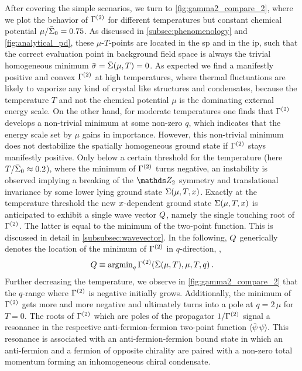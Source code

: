 After covering the simple scenarios, we turn to \cref{fig:gamma2_compare_2}, where we plot the behavior of $\Gamma^{(2)}$ for different temperatures but constant chemical potential ${\mu/\bar{\Sigma}_0 = 0.75}$.
As discussed in \cref{subsec:phenomenology} and \cref{fig:analytical_pd}, these $\mu$-$T$-points are located in the \gls{sp} and in the \gls{ip}, such that the correct evaluation point in background field space is always the trivial homogeneous minimum ${\bar{\sigma} = \bar{\Sigma} ( \mu, T ) = 0}$.
As expected we find a manifestly positive and convex $\Gamma^{(2)}$ at high temperatures, where thermal fluctuations are likely to vaporize any kind of crystal like structures and condensates, because the temperature $T$ and not the chemical potential $\mu$ is the dominating external energy scale.
On the other hand, for moderate temperatures one finds that $\Gamma^{(2)}$ develops a non-trivial minimum at some non-zero $q$, which indicates that the energy scale set by $\mu$ gains in importance.
However, this non-trivial minimum does not destabilize the spatially homogeneous ground state if $\Gamma^{(2)}$ stays manifestly positive.
Only below a certain threshold for the temperature (here $T/\bar{\Sigma}_0 \approx 0.2$), where the minimum of $\Gamma^{(2)}$ turns negative, an instability is observed implying a breaking of the $\Z_2$ symmetry and translational invariance by some lower lying ground state $\Sigma ( \mu, T, x )$.
Exactly at the temperature threshold the new $x$-dependent ground state $\Sigma ( \mu, T, x )$ is anticipated to exhibit a single wave vector $Q$, namely the single touching root of $\Gamma^{(2)}$.
The latter is equal to the minimum of the two-point function.
This is discussed in detail in \cref{subsubsec:wavevector}.
In the following, $Q$ generically denotes the location of the minimum of $\Gamma^{(2)}$ in $q$-direction, \ie{}, 
\begin{align}
	\label{eq:qmin}
	Q \equiv \mathrm{argmin}_q \, \Gamma^{(2)} ( \bar{\Sigma}( \mu, T ), \mu, T, q)\, .
\end{align}
Further decreasing the temperature, we observe in \cref{fig:gamma2_compare_2} that the $q$-range where $\Gamma^{(2)}$ is negative initially grows.
Additionally, the minimum of $\Gamma^{(2)}$ gets more and more negative and ultimately turns into a pole at ${q = 2 \, \mu}$ for ${T = 0}$.	
The roots of $\Gamma^{(2)}$ which are poles of the propagator $1/\Gamma^{(2)}$ signal a resonance in the respective anti-fermion-fermion two-point function $\langle\bar{\psi}\,\psi \rangle$. 
This resonance is associated with an anti-fermion-fermion bound state in which an anti-fermion and a fermion of opposite chirality are paired with a non-zero total momentum forming an inhomogeneous chiral condensate.
